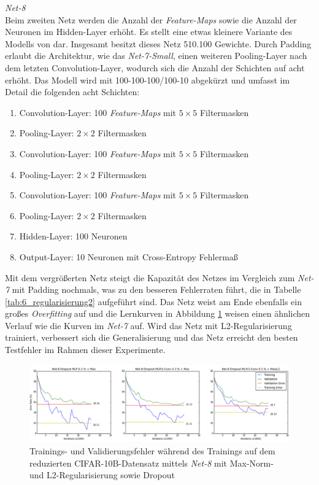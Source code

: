 \textit{Net-8} \\
Beim zweiten Netz werden die Anzahl der \textit{Feature-Maps} sowie die Anzahl der Neuronen im Hidden-Layer erhöht. Es stellt eine etwas kleinere Variante des Modells von \cite{Masci2011} dar. Insgesamt besitzt dieses Netz 510.100 Gewichte. Durch Padding erlaubt die Architektur, wie das \textit{Net-7-Small}, einen weiteren Pooling-Layer nach dem letzten Convolution-Layer, wodurch sich die Anzahl der Schichten auf acht erhöht.
Das Modell wird mit 100-100-100/100-10 abgekürzt und umfasst im Detail die folgenden acht Schichten:
\begin{enumerate}
\setlength{\itemsep}{0pt}
\item Convolution-Layer: 100 \textit{Feature-Maps} mit $5 \times 5$ Filtermasken
\item Pooling-Layer:	$2 \times 2$ Filtermasken
\item Convolution-Layer: 100 \textit{Feature-Maps} mit $5 \times 5$ Filtermasken
\item Pooling-Layer:	$2 \times 2$ Filtermasken
\item Convolution-Layer: 100 \textit{Feature-Maps} mit $5 \times 5$ Filtermasken
\item Pooling-Layer:	$2 \times 2$ Filtermasken
\item Hidden-Layer: 100 Neuronen
\item Output-Layer: 10 Neuronen mit Cross-Entropy Fehlermaß
\end{enumerate}


Mit dem vergrößerten Netz steigt die Kapazität des Netzes im Vergleich zum \textit{Net-7} mit Padding nochmals, was zu den besseren Fehlerraten führt, die in Tabelle \ref{tab:6_regularisierung2} aufgeführt sind. Das Netz weist am Ende ebenfalls ein großes \textit{Overfitting} auf und die Lernkurven in Abbildung \ref{fig:6_overfit_big} weisen einen ähnlichen Verlauf wie die Kurven im \textit{Net-7} auf. Wird das Netz mit L2-Regularisierung trainiert, verbessert sich die Generalisierung und das Netz erreicht den besten Testfehler im Rahmen dieser Experimente. 

\begin{figure}
\centering
\includegraphics[width=0.8\linewidth]{images/6_overfit_big_2}
\caption[]{Trainings- und Validierungsfehler während des Trainings auf dem reduzierten CIFAR-10B-Datensatz mittels \textit{Net-8} mit Max-Norm- und L2-Regularisierung sowie Dropout}
\label{fig:6_overfit_big}
\end{figure}

